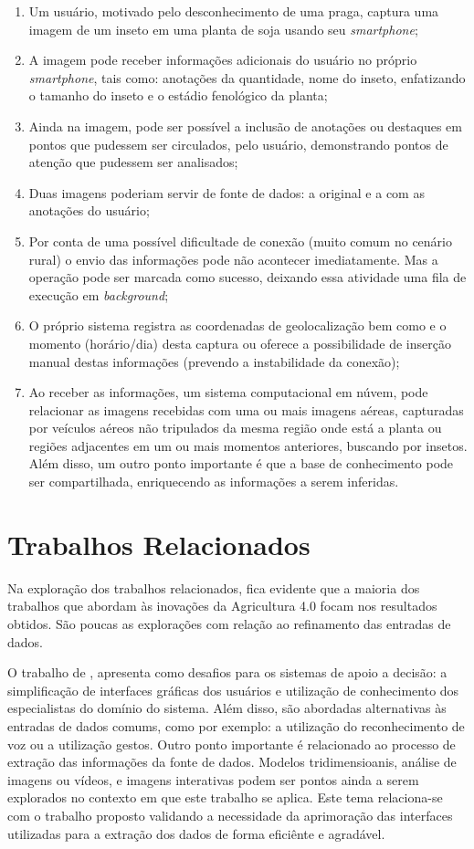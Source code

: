 \documentclass[12pt]{article}
\begin{document}
\begin{enumerate}
	\item Um usuário, motivado pelo desconhecimento de uma praga, captura uma imagem de um inseto em uma planta de soja usando seu \textit{smartphone};
	\item A imagem pode receber informações adicionais do usuário no próprio \textit{smartphone}, tais como: anotações da quantidade, nome do inseto, enfatizando o tamanho do inseto e o estádio fenológico da planta;
	\item Ainda na imagem, pode ser possível a inclusão de anotações ou destaques em pontos que pudessem ser circulados, pelo usuário, demonstrando pontos de atenção que pudessem ser analisados;
	\item Duas imagens poderiam servir de fonte de dados: a original e a com as anotações do usuário;
	\item Por conta de uma possível dificultade de conexão (muito comum no cenário rural) o envio das informações pode não acontecer imediatamente. Mas a operação pode ser marcada como sucesso, deixando essa atividade uma fila de execução em \textit{background};
	\item O próprio sistema registra as coordenadas de geolocalização bem como e o momento (horário/dia) desta captura ou oferece a possibilidade de inserção manual destas informações (prevendo a instabilidade da conexão);
	\item Ao receber as informações, um sistema computacional em núvem, pode relacionar as imagens recebidas com uma ou mais imagens aéreas, capturadas por veículos aéreos não tripulados da mesma região onde está a planta ou regiões adjacentes em um ou mais momentos anteriores, buscando por insetos. Além disso, um outro ponto importante é que a base de conhecimento pode ser compartilhada, enriquecendo as informações a serem inferidas.
\end{enumerate}

\section{Trabalhos Relacionados}

Na exploração dos trabalhos relacionados, fica evidente que a maioria dos trabalhos que abordam às inovações da Agricultura 4.0 focam nos resultados obtidos. São poucas as explorações com relação ao refinamento das entradas de dados. 

O trabalho de \cite{Zhai:2020}, apresenta como desafios para os sistemas de apoio a decisão: a simplificação de interfaces gráficas dos usuários e utilização de conhecimento dos especialistas do domínio do sistema. Além disso, são abordadas alternativas às entradas de dados comums, como por exemplo: a utilização do reconhecimento de voz ou a utilização gestos. Outro ponto importante é relacionado ao processo de extração das informações da fonte de dados. Modelos tridimensioanis, análise de imagens ou vídeos, e imagens interativas podem ser pontos ainda a serem explorados no contexto em que este trabalho se aplica. Este tema relaciona-se com o trabalho proposto validando a necessidade da aprimoração das interfaces utilizadas para a extração dos dados de forma eficiênte e agradável.
\end{document}
